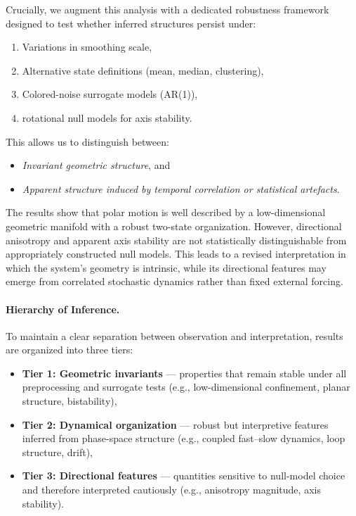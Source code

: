 \documentclass[twocolumn,9pt]{revtex4-2}
\begin{document}
Crucially, we augment this analysis with a dedicated robustness framework designed to test whether inferred structures persist under:
\begin{enumerate}
    \item Variations in smoothing scale,
    \item Alternative state definitions (mean, median, clustering),
    \item Colored-noise surrogate models (AR(1)),
    \item rotational null models for axis stability.
\end{enumerate}

This allows us to distinguish between:
\begin{itemize}
    \item \emph{Invariant geometric structure}, and
    \item \emph{Apparent structure induced by temporal correlation or statistical artefacts}.
\end{itemize}

The results show that polar motion is well described by a low-dimensional geometric manifold with a robust two-state organization. However, directional anisotropy and apparent axis stability are not statistically distinguishable from appropriately constructed null models. This leads to a revised interpretation in which the system's geometry is intrinsic, while its directional features may emerge from correlated stochastic dynamics rather than fixed external forcing.

\paragraph{Hierarchy of Inference.}
To maintain a clear separation between observation and interpretation, results are organized into three tiers:

\begin{itemize}
\item \textbf{Tier 1: Geometric invariants} — properties that remain stable under all preprocessing and surrogate tests (e.g., low-dimensional confinement, planar structure, bistability),
\item \textbf{Tier 2: Dynamical organization} — robust but interpretive features inferred from phase-space structure (e.g., coupled fast--slow dynamics, loop structure, drift),
\item \textbf{Tier 3: Directional features} — quantities sensitive to null-model choice and therefore interpreted cautiously (e.g., anisotropy magnitude, axis stability).
\end{itemize}
\end{document}
